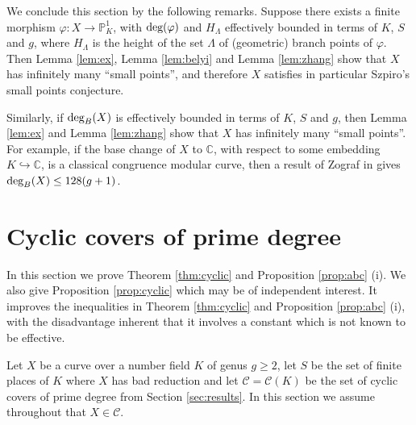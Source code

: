 \documentclass[11pt]{article}
\numberwithin{equation}{section}
\def\deg{\textnormal{deg}}
\newcommand {\CC}  {{\mathbb C}}
\begin{document}
We conclude this section by the following remarks. Suppose there exists a finite morphism $\varphi: X\to \mathbb P^1_{K}$, with $\deg(\varphi)$ and $H_\Lambda$ effectively bounded in terms of $K$, $S$ and $g$, where $H_\Lambda$ is the height of the set $\Lambda$ of (geometric) branch points of $\varphi$. Then Lemma \ref{lem:ex}, Lemma \ref{lem:belyi} and Lemma \ref{lem:zhang} show that $X$ has infinitely many ``small points'', and therefore $X$ satisfies in particular Szpiro's small points conjecture. 

Similarly, if $\deg_B(X)$ is effectively bounded in terms of $K$, $S$ and $g$, then Lemma \ref{lem:ex} and Lemma \ref{lem:zhang} show that $X$ has infinitely many ``small points''. For example, if the base change of $X$ to $\CC$, with respect to some embedding $K\hookrightarrow \CC$, is a classical congruence modular curve, then a result of Zograf in \cite{zograf:rademacher} gives $\deg_B(X)\leq 128(g+1)$.

\section{Cyclic covers of prime degree}\label{sec:cyclic}




In this section we prove Theorem \ref{thm:cyclic} and Proposition \ref{prop:abc} (i).  We also give Proposition \ref{prop:cyclic} which may be of independent interest. It improves the inequalities in Theorem \ref{thm:cyclic} and Proposition \ref{prop:abc} (i), with the disadvantage inherent that it involves a constant which is not known to be effective.

Let $X$ be a curve over a number field $K$ of genus $g\geq 2$, let $S$ be the set of finite places of $K$ where $X$ has bad reduction and let $\mathcal C=\mathcal C(K)$ be the set of cyclic covers of prime degree from Section \ref{sec:results}. In this section we assume throughout that $X\in\mathcal C$.
\end{document}
